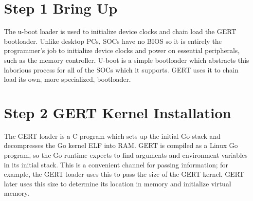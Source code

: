

\section{Step 1 Bring Up}
The u-boot loader is used to initialize device clocks and chain load the GERT bootloader.
Unlike desktop PCs, SOCs have no BIOS so it is entirely the programmer's job to initialize device clocks
and power on essential peripherals, such as the memory controller. U-boot is a simple bootloader which abstracts
this laborious process for all of the SOCs which it supports. GERT uses it to chain load its own, more specialized,
bootloader.


\section{Step 2 GERT Kernel Installation}
The GERT loader is a C program which sets up the initial Go stack and decompresses the Go kernel
ELF into RAM. GERT is compiled as a Linux Go program, so the Go runtime expects to find arguments
and environment variables in its initial stack. This is a convenient channel for passing
information; for example, the GERT loader uses this to pass the size of the GERT kernel.
GERT later uses this size to determine its location in memory and initialize virtual memory.

